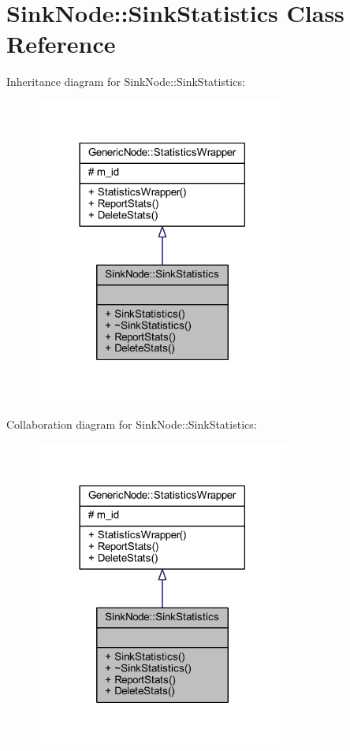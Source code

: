 \hypertarget{class_sink_node_1_1_sink_statistics}{}\section{Sink\+Node\+:\+:Sink\+Statistics Class Reference}
\label{class_sink_node_1_1_sink_statistics}


Inheritance diagram for Sink\+Node\+:\+:Sink\+Statistics\+:
\nopagebreak
\begin{figure}[H]
\begin{center}
\leavevmode
\includegraphics[width=237pt]{class_sink_node_1_1_sink_statistics__inherit__graph}
\end{center}
\end{figure}


Collaboration diagram for Sink\+Node\+:\+:Sink\+Statistics\+:
\nopagebreak
\begin{figure}[H]
\begin{center}
\leavevmode
\includegraphics[width=237pt]{class_sink_node_1_1_sink_statistics__coll__graph}
\end{center}
\end{figure}
